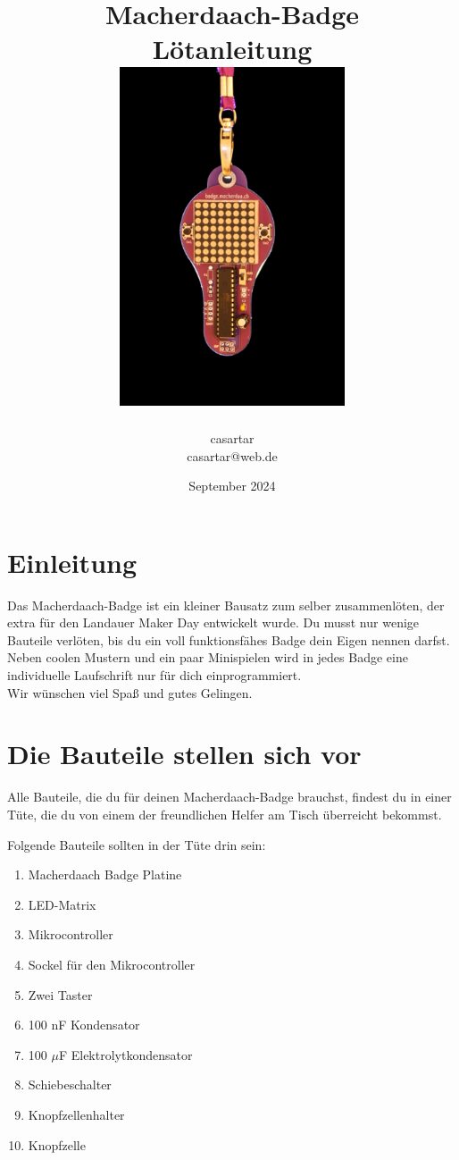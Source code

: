 \documentclass{article}
\title{Macherdaach-Badge \\ Lötanleitung \\ [1cm]
\includegraphics[width=0.5\textwidth, angle=0]{Bilder2024/Remove-bg.ai_1723059579115.png}
}
\date{September 2024}
\author{casartar\\casartar@web.de}
\begin{document}
\maketitle
\newpage
\section{Einleitung}

Das Macherdaach-Badge ist ein kleiner Bausatz zum selber zusammenlöten, der extra für den Landauer Maker Day entwickelt wurde.
Du musst nur wenige Bauteile verlöten, bis du ein voll funktionsfähes Badge dein Eigen nennen darfst. Neben coolen Mustern und ein paar Minispielen wird in jedes Badge eine individuelle Laufschrift nur für dich einprogrammiert.\\

Wir wünschen viel Spaß und gutes Gelingen. 

\section{Die Bauteile stellen sich vor}
Alle Bauteile, die du für deinen Macherdaach-Badge brauchst, findest du in einer Tüte, die du von einem der freundlichen Helfer am Tisch überreicht bekommst.

Folgende Bauteile sollten in der Tüte drin sein:

\begin{enumerate}
	\item Macherdaach Badge Platine
	\item LED-Matrix
	\item Mikrocontroller
	\item Sockel für den Mikrocontroller
	\item Zwei Taster
	\item 100 nF Kondensator
	\item 100 $\mu$F Elektrolytkondensator
	\item Schiebeschalter
	\item Knopfzellenhalter
	\item Knopfzelle
\end{enumerate}

\newpage
\end{document}
